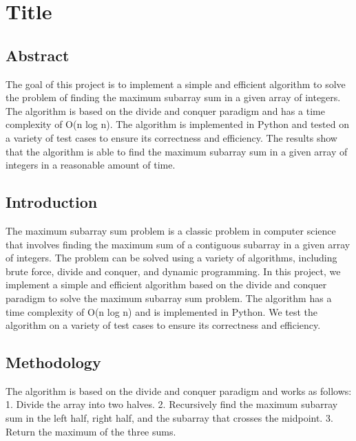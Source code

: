 \documentclass{article}
\begin{document}
\section{Title}
\subsection{Abstract}
The goal of this project is to implement a simple and efficient algorithm to solve the problem of finding the maximum subarray sum in a given array of integers. The algorithm is based on the divide and conquer paradigm and has a time complexity of O(n log n). The algorithm is implemented in Python and tested on a variety of test cases to ensure its correctness and efficiency. The results show that the algorithm is able to find the maximum subarray sum in a given array of integers in a reasonable amount of time.
\subsection{Introduction}
The maximum subarray sum problem is a classic problem in computer science that involves finding the maximum sum of a contiguous subarray in a given array of integers. The problem can be solved using a variety of algorithms, including brute force, divide and conquer, and dynamic programming. In this project, we implement a simple and efficient algorithm based on the divide and conquer paradigm to solve the maximum subarray sum problem. The algorithm has a time complexity of O(n log n) and is implemented in Python. We test the algorithm on a variety of test cases to ensure its correctness and efficiency.
\subsection{Methodology}
The algorithm is based on the divide and conquer paradigm and works as follows:
1. Divide the array into two halves.
2. Recursively find the maximum subarray sum in the left half, right half, and the subarray that crosses the midpoint.
3. Return the maximum of the three sums.
\end{document}
